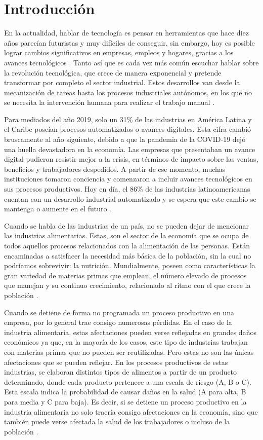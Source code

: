 \chapter*{Introducción}
En la actualidad, hablar de tecnología es pensar en herramientas que hace diez años parecían futuristas y muy difíciles de conseguir, sin embargo, hoy es posible lograr cambios significativos en empresas, empleos y hogares, gracias a los avances tecnológicos \cite{Casamitjana2021}. Tanto así que es cada vez más común escuchar hablar sobre la revolución tecnológica, que crece de manera exponencial y pretende transformar por completo el sector industrial. Estos desarrollos van desde la mecanización de tareas hasta los procesos industriales autónomos, en los que no se necesita la intervención humana para realizar el trabajo manual \cite{Rani2022}.

Para mediados del año 2019, solo un 31\% de las industrias en América Latina y el Caribe poseían procesos automatizados o avances digitales. Esta cifra cambió bruscamente al año siguiente, debido a que la pandemia de la COVID-19 dejó una huella devastadora en la economía. Las empresas que presentaban un avance digital pudieron resistir mejor a la crisis, en términos de impacto sobre las ventas, beneficios y trabajadores despedidos. A partir de ese momento, muchas instituciones tomaron conciencia y comenzaron a incluir avances tecnológicos en sus procesos productivos. Hoy en día, el 86\% de las industrias latinoamericanas cuentan con un desarrollo industrial automatizado y se espera que este cambio se mantenga o aumente en el futuro \cite{Yong2021}.

Cuando se habla de las industrias de un país, no se pueden dejar de mencionar las industrias alimentarias. Estas, son el sector de la economía que se ocupa de todos aquellos procesos relacionados con la alimentación de las personas. Están encaminadas a satisfacer la necesidad más básica de la población, sin la cual no podríamos sobrevivir: la nutrición. Mundialmente, poseen como características la gran variedad de materias primas que emplean, el número elevado de procesos que manejan y su continuo crecimiento, relacionado al ritmo con el que crece la población \cite{ValRoman2016}. 

Cuando se detiene de forma no programada un proceso productivo en una empresa, por lo general trae consigo numerosas pérdidas. En el caso de la industria alimentaria, estas afectaciones pueden verse reflejadas en grandes daños económicos ya que, en la mayoría de los casos, este tipo de industrias trabajan con materias primas que no pueden ser reutilizadas. Pero estas no son las únicas afectaciones que se pueden reflejar. En los procesos productivos de estas industrias, se elaboran distintos tipos de alimentos a partir de un producto determinado, donde cada producto pertenece a una escala de riesgo (A, B o C). Esta escala indica la probabilidad de causar daños en la salud (A para alta, B para media y C para baja). Es decir, si se detiene un proceso productivo en la industria alimentaria no solo traería consigo afectaciones en la economía, sino que también puede verse afectada la salud de los trabajadores o incluso de la población \cite{Salas2018}.

